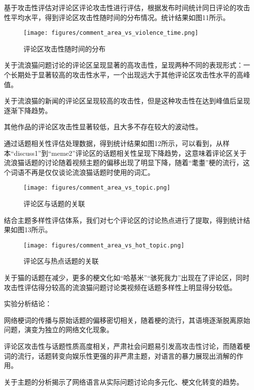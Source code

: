 \documentclass[12pt,a4paper]{ctexart}
\begin{document}
基于攻击性评估对评论区评论攻击性进行评估，根据发布时间统计同日评论的攻击性平均水平，得到评论区攻击性随时间的分布情况。统计结果如图11所示。

\begin{figure}[htbp]
    \centering
    \texttt{[image: figures/comment\_area\_vs\_violence\_time.png]}
    \caption{评论区攻击性随时间的分布}
    \label{fig:comment_area_vs_violence_time}
\end{figure}

关于流浪猫问题讨论的评论区呈现显著的高攻击性，呈现两种不同的表现形式：一个长期处于显著较高的攻击性水平，一个出现远大于其他评论区攻击性水平的高峰值。

关于流浪猫的新闻的评论区呈现较高的攻击性，但是这种攻击性在达到峰值后呈现逐渐下降趋势。

其他作品的评论区攻击性显著较低，且大多不存在较大的波动性。

通过话题相关性评估处理数据，得到统计结果如图12所示，可以看到，从样本“discuss1”到“meme2”评论区的话题相关性呈现下降趋势，这意味着评论区关于流浪猫话题的讨论随着视频主题的偏移出现了明显下降，随着“耄耋”梗的流行，这个词语不再是仅仅谈论流浪猫话题时使用的词汇。

\begin{figure}[htbp]
    \centering
    \texttt{[image: figures/comment\_area\_vs\_topic.png]}
    \caption{评论区与话题的关联}
    \label{fig:comment_area_vs_topic}
\end{figure}

结合主题多样性评估体系，我们对七个评论区的讨论热点进行了提取，得到统计结果如图13所示。

\begin{figure}[htbp]
    \centering
    \texttt{[image: figures/comment\_area\_vs\_hot\_topic.png]}
    \caption{评论区与热点话题的关联}
    \label{fig:comment_area_vs_hot_topic}
\end{figure}

关于猫的话题在减少，更多的梗文化如“哈基米”“骇死我力”出现在了评论区，同时攻击性评估得分较高的流浪猫问题讨论类视频在话题多样性上明显得分较低。

实验分析结论：

网络梗词的传播与原始话题的偏移密切相关，随着梗的流行，其语境逐渐脱离原始问题，演变为独立的网络文化现象。

评论区攻击性与话题性质高度相关，严肃社会问题易引发高攻击性讨论，而随着梗词的流行，话题转变向娱乐性更强的非严肃主题，对语言的暴力展现出消解的作用。

关于主题的分析揭示了网络语言从实际问题讨论向多元化、梗文化转变的趋势。
\end{document}
